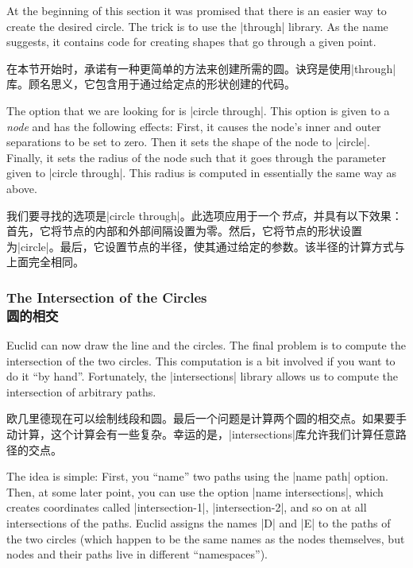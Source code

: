 At the beginning of this section it was promised that there is an easier way to
create the desired circle. The trick is to use the |through| library. As the
name suggests, it contains code for creating shapes that go through a given
point.

在本节开始时，承诺有一种更简单的方法来创建所需的圆。诀窍是使用|through|库。顾名思义，它包含用于通过给定点的形状创建的代码。

The option that we are looking for is |circle through|. This option is given to
a \emph{node} and has the following effects: First, it causes the node's inner
and outer separations to be set to zero. Then it sets the shape of the node to
|circle|. Finally, it sets the radius of the node such that it goes through the
parameter given to |circle through|. This radius is computed in essentially the
same way as above.

我们要寻找的选项是|circle through|。此选项应用于一个\emph{节点}，并具有以下效果：首先，它将节点的内部和外部间隔设置为零。然后，它将节点的形状设置为|circle|。最后，它设置节点的半径，使其通过给定的参数。该半径的计算方式与上面完全相同。
%
\begin{codeexample}[preamble={\usetikzlibrary{through}}]
\end{codeexample}



\subsubsection{The Intersection of the Circles\\圆的相交}

Euclid can now draw the line and the circles. The final problem is to compute
the intersection of the two circles. This computation is a bit involved if you
want to do it ``by hand''. Fortunately, the |intersections| library allows us
to compute the intersection of arbitrary paths.

欧几里德现在可以绘制线段和圆。最后一个问题是计算两个圆的相交点。如果要手动计算，这个计算会有一些复杂。幸运的是，|intersections|库允许我们计算任意路径的交点。

The idea is simple: First, you ``name'' two paths using the |name path| option.
Then, at some later point, you can use the option |name intersections|, which
creates coordinates called |intersection-1|, |intersection-2|, and so on at all
intersections of the paths. Euclid assigns the names |D| and |E| to the paths
of the two circles (which happen to be the same names as the nodes themselves,
but nodes and their paths live in different ``namespaces'').
%

